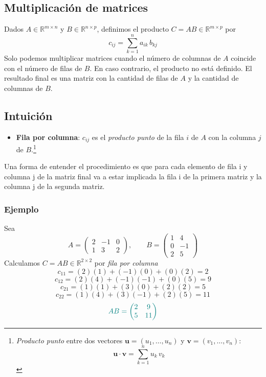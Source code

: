 \documentclass{article}
\begin{document}
\subsection*{Multiplicación de matrices}

Dados \(A\in\mathbb R^{m\times n}\) y \(B\in\mathbb R^{n\times p}\), definimos el producto \(C=AB\in\mathbb R^{m\times p}\) por
\[
c_{ij}=\sum_{k=1}^{n} a_{ik}\,b_{kj}
\]
Solo podemos multiplicar matrices cuando el número de columnas de \(A\) coincide con el número de filas de \(B\). En caso contrario, el producto no está definido. El resultado final es una matriz con la cantidad de filas de \(A\) y la cantidad de columnas de \(B\).

\subsection*{Intuición}
\begin{itemize}
  \item \textbf{{\color{teal}Fila por columna}}: \(c_{ij}\) es el \emph{producto punto} de la fila \(i\) de \(A\) con la columna \(j\) de \(B\).\footnote{\smallskip
{\color{teal}\textit{Producto punto}} entre dos vectores \(\mathbf u=(u_1,\dots,u_n)\) y \(\mathbf v=(v_1,\dots,v_n)\):
\[
\mathbf u\cdot \mathbf v=\sum_{k=1}^{n} u_k\,v_k
\] }
  
\end{itemize}
Una forma de entender el procedimiento es que para cada elemento de fila i y columna j de la matriz final va a estar implicada la fila i de la primera matriz y la columna j de la segunda matriz.

\subsubsection*{Ejemplo}
Sea
\[
A=\begin{pmatrix}
2 & -1 & 0\\
1 & 3 & 2
\end{pmatrix},
\qquad
B=\begin{pmatrix}
1 & 4\\
0 & -1\\
2 & 5
\end{pmatrix}
\]
Calculamos \(C=AB\in\mathbb R^{2\times 2}\) por \emph{fila por columna}
\[
c_{11}=(2)(1)+(-1)(0)+(0)(2)=2
\]
\[
c_{12}=(2)(4)+(-1)(-1)+(0)(5)=9
\]
\[
c_{21}=(1)(1)+(3)(0)+(2)(2)=5
\]
\[
c_{22}=(1)(4)+(3)(-1)+(2)(5)=11
\]
\[\color{teal}
AB=\begin{pmatrix}2&9\\ 5&11\end{pmatrix}
\]
\end{document}
